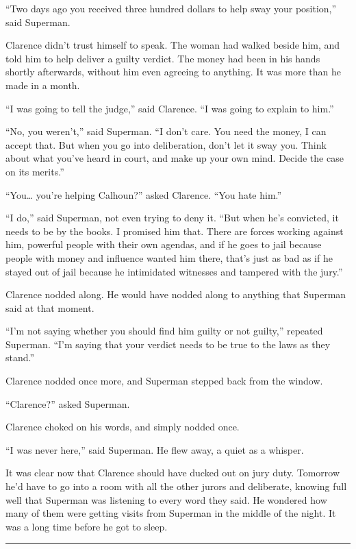 ``Two days ago you received three hundred dollars to help sway your
position,'' said Superman.

Clarence didn't trust himself to speak. The woman had walked beside him,
and told him to help deliver a guilty verdict. The money had been in his
hands shortly afterwards, without him even agreeing to anything. It was
more than he made in a month.

``I was going to tell the judge,'' said Clarence. ``I was going to
explain to him.''

``No, you weren't,'' said Superman. ``I don't care. You need the money,
I can accept that. But when you go into deliberation, don't let it sway
you. Think about what you've heard in court, and make up your own mind.
Decide the case on its merits.''

``You\ldots{} you're helping Calhoun?'' asked Clarence. ``You hate
him.''

``I do,'' said Superman, not even trying to deny it. ``But when he's
convicted, it needs to be by the books. I promised him that. There are
forces working against him, powerful people with their own agendas, and
if he goes to jail because people with money and influence wanted him
there, that's just as bad as if he stayed out of jail because he
intimidated witnesses and tampered with the jury.''

Clarence nodded along. He would have nodded along to anything that
Superman said at that moment.

``I'm not saying whether you should find him guilty or not guilty,''
repeated Superman. ``I'm saying that your verdict needs to be true to
the laws as they stand.''

Clarence nodded once more, and Superman stepped back from the window.

``Clarence?'' asked Superman.

Clarence choked on his words, and simply nodded once.

``I was never here,'' said Superman. He flew away, a quiet as a whisper.

It was clear now that Clarence should have ducked out on jury duty.
Tomorrow he'd have to go into a room with all the other jurors and
deliberate, knowing full well that Superman was listening to every word
they said. He wondered how many of them were getting visits from
Superman in the middle of the night. It was a long time before he got to
sleep.

\begin{center}\rule{0.5\linewidth}{\linethickness}\end{center}

